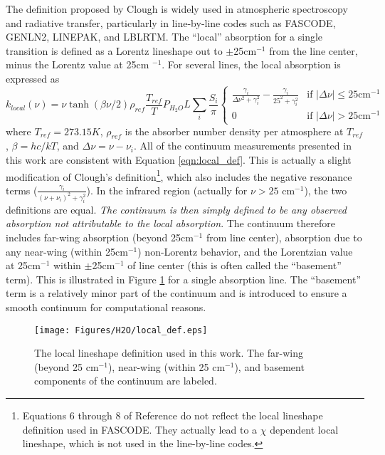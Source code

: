 \documentclass[11pt]{article}
\begin{document}
The definition proposed by Clough is widely used in atmospheric 
spectroscopy and radiative transfer, particularly in line-by-line codes 
such as FASCODE\cite{clo:81}, GENLN2\cite{edw:87}, LINEPAK\cite{gor:94}, 
and LBLRTM.  The ``local''
absorption for a single transition is defined as a Lorentz lineshape out to
$\pm$25cm$^{-1}$ from the line center, minus the Lorentz value at 25cm
$^{-1}$. For several lines, the local absorption is expressed 
as\cite{clo:89}
\begin{equation}
k_{local}(\nu)=\nu\tanh\left(\beta\nu/2\right) \rho_{ref}
\frac{T_{ref}}{T}P_{H_{2}O}L
\sum_i\frac{S_i}{\pi}\left\{\begin{array}{cl}
\frac{\gamma_i}{\Delta\nu^{2}+\gamma_i^2}-\frac{\gamma_i}{25^2+\gamma_i^2}
                        & \mbox{if $|\Delta\nu| \leq 25 \mbox{cm}^{-1}$} \\
        0               & \mbox{if $|\Delta\nu| > 25 \mbox{cm}^{-1}$}
\end{array}\right.
\label{eqn:local_def}
\end{equation}
where $T_{ref}=273.15K$, $\rho_{ref}$ is the absorber number density per
atmosphere at $T_{ref}$, $\beta=hc/kT$, and $\Delta\nu=\nu-\nu_i$.
All of the continuum measurements presented in this work are consistent
with Equation \ref{eqn:local_def}.  
This is actually a slight modification of Clough's
definition\footnote{Equations 6 through 8 of Reference
\protect\cite{clo:89} do not reflect the local lineshape definition used
in FASCODE.  They actually lead to a $\chi$ dependent local lineshape, 
which is not used in the line-by-line codes.}, which
also includes the negative resonance terms ($\frac{\gamma_i}{(\nu+\nu_i)^2
+\gamma_i^2}$).  In the infrared region (actually for $\nu > 25$
cm$^{-1}$), the two definitions are equal.  {\em The continuum is then 
simply defined to be any observed absorption not attributable to the local
absorption}.  The continuum therefore includes 
far-wing absorption (beyond 25cm$^{-1}$ from line center), absorption 
due to any near-wing (within 25cm$^{-1}$) non-Lorentz behavior, and 
the Lorentzian value at 25cm$^{-1}$ within $\pm$25cm$^{-1}$ of line 
center (this is often called the ``basement'' term).  This is illustrated 
in Figure \ref{fig:localdef} for a single absorption line.
The ``basement'' term is a relatively minor part of the continuum and is 
introduced to ensure a smooth continuum for computational reasons.  

\begin{figure}[h]
 \begin{center}
 \texttt{[image: Figures/H2O/local\_def.eps]}
 \end{center}
 \caption[The local lineshape definition.]{The local lineshape definition
 used in this work.  The far-wing (beyond 25 cm$^{-1}$), near-wing (within
 25 cm$^{-1}$), and basement components of the continuum are labeled.}
 \label{fig:localdef}
\end{figure}
\end{document}
